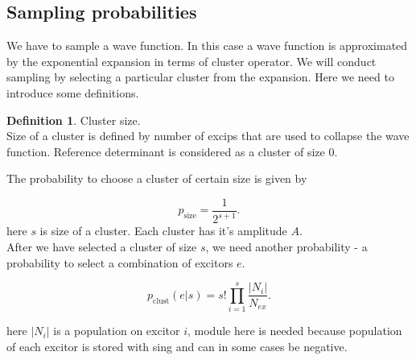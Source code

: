 \documentclass[twoside,english]{uiofysmaster}
\theoremstyle{definition}
\newtheorem{defn}{Definition}
\begin{document}
\subsection{Sampling probabilities}
We have to sample a wave function. In this case a wave function is approximated by the exponential expansion in terms of cluster operator. We will conduct sampling by selecting a particular cluster from the expansion. Here we need to introduce some definitions.\\

\begin{defn}Cluster size.\\
 Size of a cluster is defined by number of excips that are used to collapse the wave function. Reference determinant is considered as a cluster of size $0$.
\end{defn}
The probability to choose a cluster of certain size is given by

\begin{equation}
	p_{\text{size}} = \frac{1}{2^{s+1}}.
\end{equation}
here $s$ is size of a cluster. 
Each cluster has it's amplitude $A$.\\
After we have selected a cluster of size $s$, we need another probability - a probability to select a combination of excitors $e$.

\begin{equation}
p_{\text{clust}} (e|s)= s! \prod_{i=1}^s \frac{|N_i|}{N_{ex}}.
\end{equation}

here $|N_i|$ is a population on excitor $i$, module here is needed because population of each excitor is stored with sing and can in some cases be negative.\\
\end{document}
